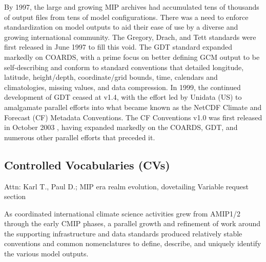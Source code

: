 \documentclass[gmd, preprint]{copernicus}
\newcommand{\mycomment}[1]{}
\def\cred#1{{\color{red}#1}}
\begin{document}
By 1997, the large and growing MIP archives had accumulated tens of thousands of output files from tens of model configurations. There was a need to enforce standardization on model outputs to aid their ease of use by a diverse and growing international community. The Gregory, Drach, and Tett \citep[GDT v0;][]{gregory_gdt_1999} standards were first released in June 1997 to fill this void. The GDT standard expanded markedly on COARDS, with a prime focus on better defining GCM output to be self-describing and conform to standard conventions that detailed longitude, latitude, height/depth, coordinate/grid bounds, time, calendars and climatologies, missing values, and data compression. In 1999, the continued development of GDT ceased at v1.4, with the effort led by Unidata (US) to amalgamate parallel efforts into what became known as the NetCDF Climate and Forecast (CF) Metadata Conventions. The CF Conventions v1.0 was first released in October 2003 \citep{eaton_netcdf_2024}, having expanded markedly on the COARDS, GDT, and numerous other parallel efforts that preceded it.

\mycomment{
https://www.unidata.ucar.edu/software/netcdf/conventions.html
https://www.unidata.ucar.edu/software/netcdf/coords/proposals.html
COARDS 1995 - https://web.archive.org/web/20100527095818/http://ferret.wrc.noaa.gov/noaa_coop/coop_cdf_profile.html
GDT 1997
https://www.unidata.ucar.edu/mailing_lists/archives/netcdfgroup/1997/msg00080.html
https://www.unidata.ucar.edu/software/netcdf/coords/0054.html 1997
https://web.archive.org/web/20100610102527/http://www-pcmdi.llnl.gov/drach/GDT_convention.html 1999
https://web.archive.org/web/20040604041414/http://www-pcmdi.llnl.gov/drach/netCDF.html
CF 2003 - https://cfconventions.org/Data/cf-conventions/cf-conventions-1.11/cf-conventions.html#_version_1_0_28_october_2003 
}


\subsection{Controlled Vocabularies (CVs)}
\label{sec:CMIPCVs}
\cred{Attn: Karl T., Paul D.; MIP era realm evolution, dovetailing Variable request section}

As coordinated international climate science activities grew from AMIP1/2 through the early CMIP phases, a parallel growth and refinement of work around the supporting infrastructure and data standards produced relatively stable conventions and common nomenclatures to define, describe, and uniquely identify the various model outputs.
\end{document}
